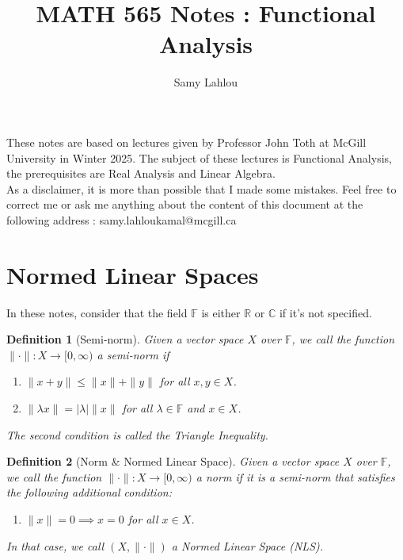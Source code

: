\documentclass[12pt]{article}
\title{MATH 565 Notes : Functional Analysis}
\author{Samy Lahlou}
\date{}
\newtheorem*{definition}{Definition}
\newcommand{\C}{\mathbb{C}}
\newcommand{\R}{\mathbb{R}}
\newcommand{\F}{\mathbb{F}}
\begin{document}
\maketitle

These notes are based on lectures given by Professor John Toth at McGill University in Winter 2025. The subject of these lectures is Functional Analysis, the prerequisites are Real Analysis and Linear Algebra. \\
As a disclaimer, it is more than possible that I made some mistakes. Feel free to correct me or ask me anything about the content of this document at the following address : samy.lahloukamal@mcgill.ca

\tableofcontents

\newpage

\section{Normed Linear Spaces}

In these notes, consider that the field $\F$ is either $\R$ or $\C$ if it's not specified.

\begin{definition}[Semi-norm]
    Given a vector space $X$ over $\F$, we call the function $\|\cdot\| : X \to [0, \infty)$ a semi-norm if
    \begin{enumerate}
        \item $\|x + y\| \leq \|x\| + \|y\|$ for all $x,y\in X$.
        \item $\|\lambda x\| = |\lambda| \|x\|$ for all $\lambda \in \F$ and $x \in X$.
    \end{enumerate}
    The second condition is called the \textit{Triangle Inequality}.
\end{definition}

\begin{definition}[Norm \& Normed Linear Space]
    Given a vector space $X$ over $\F$, we call the function $\|\cdot\| : X \to [0, \infty)$ a norm if it is a semi-norm that satisfies the following additional condition: 
    \begin{enumerate}
        \item $\|x\| = 0 \implies x = 0$ for all $x\in X$.
    \end{enumerate}
    In that case, we call $(X, \|\cdot\|)$ a Normed Linear Space (NLS).
\end{definition}
\end{document}
